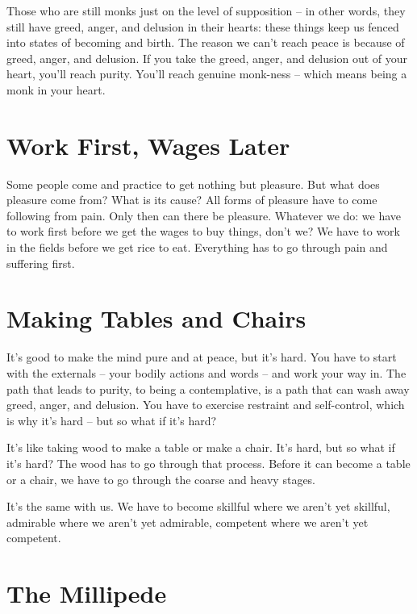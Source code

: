 Those who are still monks just on the level of supposition -- in other words, they still have greed, anger, and delusion in their hearts: these things keep us fenced into states of becoming and birth. The reason we can't reach peace is \mbox{because} of greed, anger, and delusion. If you take the greed, anger, and delusion out of your heart, you'll reach purity. You'll reach genuine monk-ness -- which means being a monk in your heart.

\clearpage

\section{Work First, Wages Later}

Some people come and practice to get nothing but pleasure. But what does pleasure come from? What is its cause? All forms of pleasure have to come following from pain. Only then can there be pleasure. Whatever we do: we have to work first before we get the wages to buy things, don't we? We have to work in the fields before we get rice to eat. Everything has to go through pain and suffering first.

\section{Making Tables and Chairs}

It's good to make the mind pure and at peace, but it's hard. You have to start with the externals -- your bodily actions and words -- and work your way in. The path that leads to purity, to being a contemplative, is a path that can wash away greed, anger, and delusion. You have to exercise restraint and self-control, which is why it's hard -- but so what if it's hard?

It's like taking wood to make a table or make a chair. It's hard, but so what if it's hard? The wood has to go through that process. Before it can become a table or a chair, we have to go through the coarse and heavy stages. 

It's the same with us. We have to become skillful where we aren't yet skillful, admirable where we aren't yet admirable, competent where we aren't yet competent. 

\clearpage

\section{The Millipede}

